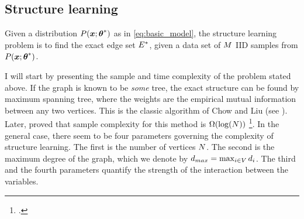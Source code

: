 \subsection{Structure learning}
\label{sec:structure}
Given a distribution $P(\boldsymbol{x};{\boldsymbol{\theta}}^{*})$ as in \eqref{eq:basic_model},
the structure learning problem is to find the exact edge set ${E}^{*}$, given a data set of $M$ IID samples from $P(\boldsymbol{x};{\boldsymbol{\theta}}^{*})$.

I will start by presenting the sample and time complexity of the problem stated above. 
If the graph is known to be {\em some} tree, the exact structure can be found by maximum spanning tree, where the weights are the empirical mutual information between any two vertices. This is the classic algorithm of Chow and Liu (see \cite{chowLiu}). Later, \cite{tan2011large} proved that sample complexity for this method is $\Omega(\log({N}))$%
\footnote{.}.
In the general case, there seem to be four parameters governing the complexity of structure learning.
The first is the number of vertices $N$.
The second is the maximum degree of the graph, which we denote by $d_{max} = \max_{i \in V} d_i$.
The third and the fourth parameters quantify the strength of the interaction between the variables.

